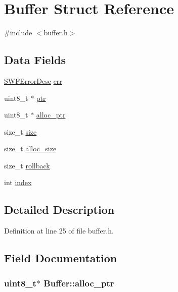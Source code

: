 \hypertarget{struct_buffer}{}\section{Buffer Struct Reference}
\label{struct_buffer}


{\ttfamily \#include $<$buffer.\+h$>$}

\subsection*{Data Fields}
\begin{DoxyCompactItemize}
\item 
\hyperlink{struct_s_w_f_error_desc}{S\+W\+F\+Error\+Desc} \hyperlink{struct_buffer_a879aecdae33529cd7b68da64db41e5af}{err}
\item 
uint8\+\_\+t $\ast$ \hyperlink{struct_buffer_a31a306e12a70a812149b2eaf22279ea5}{ptr}
\item 
uint8\+\_\+t $\ast$ \hyperlink{struct_buffer_a18c1ecd1f7dc2dbeb5f576aecca97560}{alloc\+\_\+ptr}
\item 
size\+\_\+t \hyperlink{struct_buffer_a24e94f119f4b386771c78cf37aaff41b}{size}
\item 
size\+\_\+t \hyperlink{struct_buffer_a96fe3160d9fc953e060a14b6c2ad52bd}{alloc\+\_\+size}
\item 
size\+\_\+t \hyperlink{struct_buffer_a056d3a336c67135e9c516bc6bd20e6b7}{rollback}
\item 
int \hyperlink{struct_buffer_abb6fa5333fd31327f6c5cb2e56e4a5ae}{index}
\end{DoxyCompactItemize}


\subsection{Detailed Description}


Definition at line 25 of file buffer.\+h.



\subsection{Field Documentation}
\hypertarget{struct_buffer_a18c1ecd1f7dc2dbeb5f576aecca97560}{}
\subsubsection[{alloc\+\_\+ptr}]{\setlength{\rightskip}{0pt plus 5cm}uint8\+\_\+t$\ast$ Buffer\+::alloc\+\_\+ptr}\label{struct_buffer_a18c1ecd1f7dc2dbeb5f576aecca97560}


